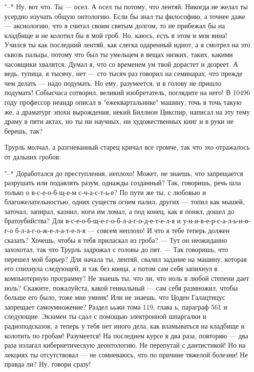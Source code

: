 "--* Ну, вот что. Ты --- осел. А осел ты потому, что лентяй.
Никогда не желал ты усердно изучать общую онтологию. Если бы
знал ты философию, а точнее даже --- аксиологию, что я считал
своим святым долгом, то не прибежал бы на кладбище и не
колотил бы в мой гроб. Но, каюсь, есть в этом и моя вина!
Учился ты как последний лентяй, как слегка одаренный идиот,
а я смотрел на это сквозь пальцы, потому что был ты умельцем
в вещах низких, таких, какими часовщики хвалятся. Думал я,
что со временем ум твой дорастет и дозреет. А ведь, тупица,
я тысячу, нет --- сто тысяч раз говорил на семинарах, что
прежде чем делать --- надо подумать. Но ему, разумеется, и в
голову не пришло подумать! Собысчаса сотворил, великий
изобретатель, поглядите на него! В 10496 году профессор
неандр описал в "ежеквартальнике" машину, точь в точь такую
же, а драматург эпохи вырождения, некий Биллион Цикспир,
написал на эту тему драму в пяти актах, но ты ни научных, ни
художественных книг и в руки не берешь, так?

Трурль молчал, а разгневанный старец кричал все громче,
так что эхо отражалось от дальних гробов:

"--* Доработался до преступления, неплохо! Может, не
знаешь, что запрещается разрушать или подавлять разум,
однажды созданный? Так, говоришь, речь шла только о
в-с-е-о-б-щ-е-м с-ч-а-с-т-ь-е? По пути же ты, с любовью и
благожелательностью, одних существ огнем палил, других --- топил
как мышей, заточал, запирал, казнил, ноги им ломал, а
под конец, как я понял, дошел до братоубийства? Для
в-с-е-о-б-щ-е-г-о-б-л-а-г-о-д-е-т-е-л-я и
у-н-и-в-е-р-с-а-л-ь-н-о-г-о б-л-а-г-о-ж-е-л-а-т-е-л-я
--- совсем неплохо! И что я тебе теперь должен сказать?
Хочешь, чтобы я тебя приласкал из гроба? --- Тут он
неожиданно захохотал, так что Трурль задрожал с головы до
пят. --- Так говоришь, что перешел мой барьер? Для начала ты,
лентяй, свалил задание на машину, которая его спихнула
следующей, и так без конца, а потом сам себя запихнул в
компьютерную программу? Не знаешь ты, что ли, что ноль в
любой степени дает ноль? Скажите, пожалуйста, какой
гениальный --- сам себя  размножил, чтобы больше его было,
тоже мне умник! Или не знаешь, что Цоден Галацтицус
запрещает самоумножение? Раздел ььжи тома 119, глава ь,
параграф 561 и следующие. Экзамен ты сдал с помощью
электронной шпаргалки и радиоподсказок, а теперь у тебя нет
иного дела, как вламываться на кладбище и колотить по
гробам! Разумеется! На последнем курсе я два раза, повторяю --- два
раза излагал кибернетическую деонтологию. Не перепутай
с дантистикой! Но на лекциях ты отсутствовал --- не
сомневаюсь, что по причине тяжелой болезни! Не правда ли?
Ну, говори сразу!

